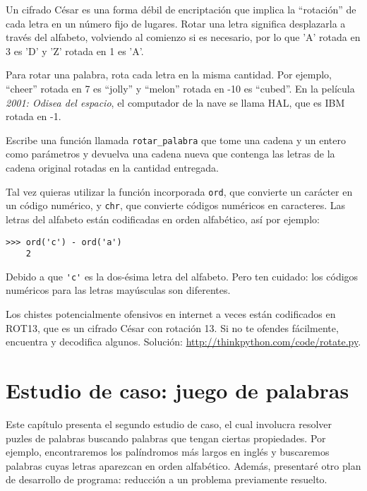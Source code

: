 \documentclass[10pt]{book}
\begin{document}
\begin{exercise}

\label{exrotate}
Un cifrado César es una forma débil de encriptación que implica la ``rotación'' de cada
letra en un número fijo de lugares.  Rotar una letra significa
desplazarla a través del alfabeto, volviendo al comienzo si
es necesario, por lo que 'A' rotada en 3 es 'D' y 'Z' rotada en 1 es 'A'.

Para rotar una palabra, rota cada letra en la misma cantidad.
Por ejemplo, ``cheer'' rotada en 7 es ``jolly'' y ``melon'' rotada
en -10 es ``cubed''.  En la película {\em 2001: Odisea del espacio}, el
computador de la nave se llama HAL, que es IBM rotada en -1.


Escribe una función llamada \verb"rotar_palabra"
que tome una cadena y un entero como parámetros y devuelva
una cadena nueva que contenga las letras de la cadena original
rotadas en la cantidad entregada.

Tal vez quieras utilizar la función incorporada {\tt ord}, que convierte
un carácter en un código numérico, y {\tt chr}, que convierte códigos
numéricos en caracteres.  Las letras del alfabeto están codificadas en orden alfabético,
así por ejemplo:

\begin{verbatim}
>>> ord('c') - ord('a')
    2
\end{verbatim}

Debido a que \verb"'c'" es la dos-ésima letra del alfabeto.  Pero ten
cuidado: los códigos numéricos para las letras mayúsculas son diferentes.

Los chistes potencialmente ofensivos en internet a veces están codificados en
ROT13, que es un cifrado César con rotación 13.  Si no te
ofendes fácilmente, encuentra y decodifica algunos.  Solución:
\url{http://thinkpython.com/code/rotate.py}.

\end{exercise}


\chapter{Estudio de caso: juego de palabras}
\label{wordplay}

Este capítulo presenta el segundo estudio de caso, el cual involucra
resolver puzles de palabras buscando palabras que tengan ciertas
propiedades.  Por ejemplo, encontraremos los palíndromos más largos
en inglés y buscaremos palabras cuyas letras aparezcan en
orden alfabético.  Además, presentaré otro plan de desarrollo de
programa: reducción a un problema previamente resuelto.
\end{document}
